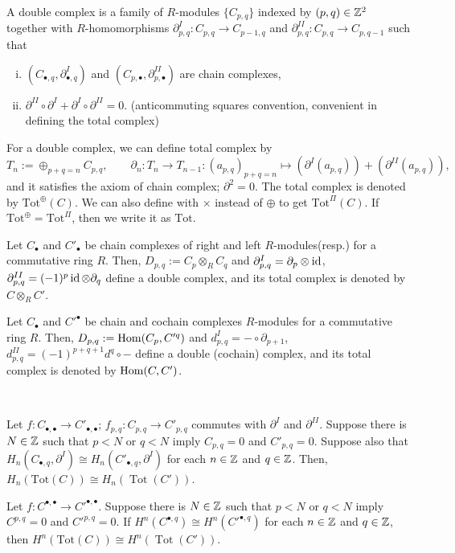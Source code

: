 \documentclass{../../small}
\DeclareMathOperator{\Tot}{Tot}
\begin{document}
\begin{defn*}
A double complex is a family of $R$-modules $\{C_{p,q}\}$ indexed by $(p,q)\in\mathbb{Z}^2$ together with $R$-homomorphisms $\partial_{p,q}^I:C_{p,q}\to C_{p-1,q}$ and $\partial_{p,q}^{II}:C_{p,q}\to C_{p,q-1}$ such that
\begin{enumerate}[(i)]
\item  $(C_{\bullet,q},\partial_{\bullet,q}^I)$ and $(C_{p,\bullet},\partial_{p,\bullet}^{II})$ are chain complexes,
\item $\partial^{II}\circ\partial^I+\partial^I\circ\partial^{II}=0$. (anticommuting squares convention, convenient in defining the total complex)
\end{enumerate}
For a double complex, we can define total complex by
\[T_n:=\oplus_{p+q=n} C_{p,q},\qquad\partial_n:T_n\to T_{n-1}:(a_{p,q})_{p+q=n}\mapsto(\partial^I(a_{p,q}))+(\partial^{II}(a_{p,q})),\]
and it satisfies the axiom of chain complex; $\partial^2=0$.
The total complex is denoted by $\mathrm{Tot}^\oplus(C)$.
We can also define with $\times$ instead of $\oplus$ to get $\mathrm{Tot}^\Pi(C)$.
If $\mathrm{Tot}^\oplus=\mathrm{Tot}^\Pi$, then we write it as $\mathrm{Tot}$.
\end{defn*}
\begin{ex*}
Let $C_\bullet$ and $C'_\bullet$ be chain complexes of right and left $R$-modules(resp.) for a commutative ring $R$.
Then, $D_{p,q}:=C_p\otimes_RC_q$ and $\partial_{p,q}^I=\partial_p\otimes\operatorname{id}$, $\partial_{p,q}^{II}=(-1)^p\operatorname{id}\otimes\partial_q$ define a double complex, and its total complex is denoted by $C\otimes_RC'$.
\end{ex*}

\begin{ex*}
Let $C_\bullet$ and $C'^\bullet$ be chain and cochain complexes $R$-modules for a commutative ring $R$.
Then, $D_{p,q}:=\operatorname{Hom}(C_p,C'^q)$ and $d_{p,q}^I=-\circ\partial_{p+1}$, $d_{p,q}^{II}=(-1)^{p+q+1}d^q\circ-$ define a double (cochain) complex, and its total complex is denoted by $\operatorname{Hom}(C,C')$.
\end{ex*}

\begin{prop*}[2.3.1]\,
\begin{parts}
\item
Let $f:C_{\bullet,\bullet}\to C'_{\bullet,\bullet}$; $f_{p,q}:C_{p,q}\to C'_{p,q}$ commutes with $\partial^I$ and $\partial^{II}$.
Suppose there is $N\in\mathbb{Z}$ such that $p<N$ or $q<N$ imply $C_{p,q}=0$ and $C'_{p,q}=0$.
Suppose also that $H_n(C_{\bullet,q},\partial^I)\cong H_n(C'_{\bullet,q},\partial^I)$ for each $n\in\mathbb{Z}$ and $q\in\mathbb{Z}$.
Then, $H_n(\mathrm{Tot}(C))\cong H_n(\Tot(C'))$.

\item
Let $f:C^{\bullet,\bullet}\to C'^{\bullet,\bullet}$.
Suppose there is $N\in\mathbb{Z}$ such that $p<N$ or $q<N$ imply $C^{p,q}=0$ and $C'^{p,q}=0$.
If $H^n(C^{\bullet,q})\cong H^n(C'^{\bullet,q})$ for each $n\in\mathbb{Z}$ and $q\in\mathbb{Z}$, then $H^n(\mathrm{Tot}(C))\cong H^n(\Tot(C'))$.
\end{parts}
\end{prop*}
\end{document}
